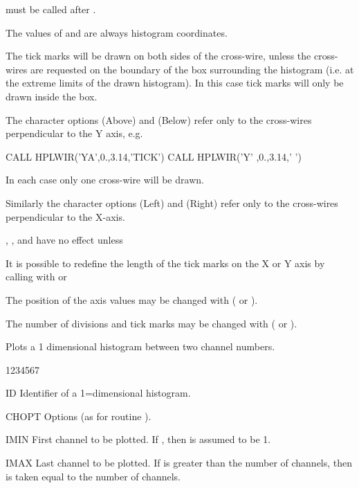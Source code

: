 \begin{UL}
\item {} must be called after .
\item The values of  and  are always histogram coordinates.
\item The tick marks will be drawn on both sides of the cross-wire, unless the 
      cross-wires are requested on the boundary of the box surrounding the 
      histogram (i.e. at the extreme limits of the drawn histogram). In this 
      case tick marks will only be drawn inside the box.
\item The character options  (Above) and  (Below) refer only 
      to the cross-wires perpendicular to the Y axis, e.g.
      \begin{XMP}
      CALL HPLWIR('YA',0.,3.14,'TICK')
      CALL HPLWIR('Y' ,0.,3.14,' ')
      \end{XMP}
      In each case only one cross-wire will be drawn.
\item Similarly the character options  (Left) and  (Right) 
      refer only to the cross-wires perpendicular to the X-axis.
\item {}, ,  and  have no effect unless 
\item It is possible to redefine the length of the tick marks on the X or Y axis
      by calling  with  or 
\item The position of the axis values may be changed with  
      ( or ).
\item The number of divisions and tick marks may be changed with  
      ( or ).
\end{UL}


\Action
Plots a 1 dimensional histogram between two channel numbers.
\Pdesc
\begin{DLtt}{1234567}
\item[ID]    Identifier of a 1=dimensional histogram.
\item[CHOPT] Options (as for routine ).
\item[IMIN]  First channel to be plotted. If , then 
              is assumed to be 1.
\item[IMAX]  Last channel to be plotted. If  is greater than the 
             number of channels, then  is taken equal to the number of
             channels.
\end{DLtt}


